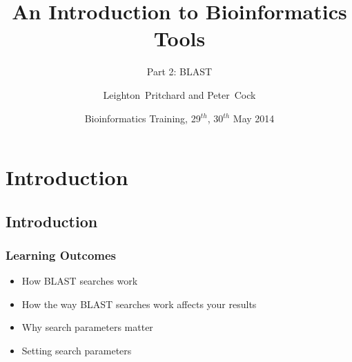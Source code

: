 
%



\title[Intro to Bioinformatics] %
{An Introduction to Bioinformatics Tools}
\subtitle{Part 2: BLAST}
\author[Pritchard, Cock] %
{Leighton~Pritchard and Peter~Cock}
\date[May 2014] %
{Bioinformatics Training, 29$^{th}$, 30$^{th}$ May 2014}
\subject{Bioinformatics}





\frame[plain]{\titlepage}

\section{Introduction}
\subsection{Introduction}
\begin{frame}
  \frametitle{Learning Outcomes}
  \begin{itemize}
    \item How BLAST searches work
    \item How the way BLAST searches work affects your results
    \item Why search parameters matter
    \item Setting search parameters
 \end{itemize}
\end{frame}    
  
